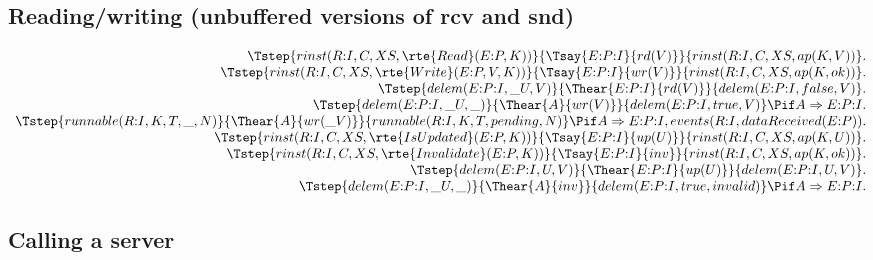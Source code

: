 \subsection{Reading/writing (unbuffered versions of rcv and snd)}


\[
\begin{array}{r@{}c@{}l}
  \Tstep{rinst(R{:}I, C, XS, \rte{Read}(E{:}P,K))}       {\Tsay{E{:}P{:}I}{rd(V)}} {rinst(R{:}I, C, XS, ap(K,V))} .
\\\Tstep{rinst(R{:}I, C, XS, \rte{Write}(E{:}P,V,K))}    {\Tsay{E{:}P{:}I}{wr(V)}} {rinst(R{:}I, C, XS, ap(K,ok))}.
\\\Tstep{delem(E{:}P{:}I, \_U, V)}                       {\Thear{E{:}P{:}I}{rd(V)}}{delem(E{:}P{:}I, false, V)}        .
\\\Tstep{delem(E{:}P{:}I, \_U, \_)}                      {\Thear{A}{wr(V)}}        {delem(E{:}P{:}I, true, V)}            \Pif    A\Rightarrow{}E{:}P{:}I .
\\\Tstep{runnable(R{:}I, K, T, \_, N)}                   {\Thear{A}{wr(\_V)}}      {runnable(R{:}I, K, T, pending, N)}    \Pif    A\Rightarrow{}E{:}P{:}I, events(R{:}I, dataReceived(E{:}P))    .
\\\Tstep{rinst(R{:}I, C, XS, \rte{IsUpdated}(E{:}P,K))}  {\Tsay{E{:}P{:}I}{up(U)}} {rinst(R{:}I, C, XS, ap(K,U))} .
\\\Tstep{rinst(R{:}I, C, XS, \rte{Invalidate}(E{:}P,K))} {\Tsay{E{:}P{:}I}{inv}}   {rinst(R{:}I, C, XS, ap(K,ok))}.
\\\Tstep{delem(E{:}P{:}I, U, V)}                         {\Thear{E{:}P{:}I}{up(U)}}{delem(E{:}P{:}I, U, V)} .
\\\Tstep{delem(E{:}P{:}I, \_U, \_)}                      {\Thear{A}{inv}}          {delem(E{:}P{:}I, true, invalid)}      \Pif    A\Rightarrow{}E{:}P{:}I .
\end{array}
\]


\subsection{Calling a server}

